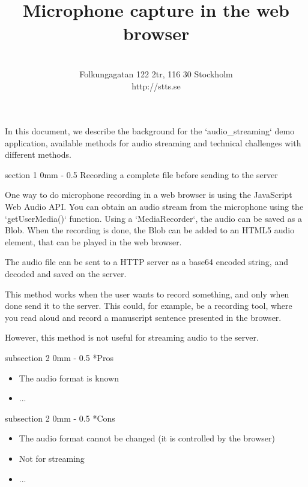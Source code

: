 \documentclass[11pt, a4paper, twoside]{article}
\title{ Microphone capture in the web browser }
\author{ \stts \\
  Folkungagatan 122 2tr, 116 30 Stockholm\\
  http://stts.se }
\makeatletter
\renewcommand{\subsection}{\@startsection
   {subsection}%
   {2}%
   {0mm}%
   {-\baselineskip}%
   {0.5\baselineskip}%
   {\bfseries\sffamily\large}}%
\renewcommand{\section}{\@startsection
   {section}%
   {1}%
   {0mm}%
   {-\baselineskip}%
   {0.5\baselineskip}%
   {\bfseries\sffamily\Large}}%
\makeatother
\begin{document}
  
  \maketitle
 \cfoot{\thepage (\pageref{LastPage})}  
  

In this document, we describe the background for the `audio\_streaming` demo application, available methods for audio streaming and technical challenges with different methods.


\section{Recording a complete file before sending to the server}

One way to do microphone recording in a web browser is using the JavaScript Web Audio API. You can obtain an audio stream from the microphone using the `getUserMedia()` function. Using a `MediaRecorder`, the audio can be saved as a Blob. When the recording is done, the Blob can be added to an HTML5 audio element, that can be played in the web browser.

The audio file can be sent to a HTTP server as a base64 encoded string, and decoded and saved on the server.

This method works when the user wants to record something, and only when done send it to the server. This could, for example, be a recording tool, where you read aloud and record a manuscript sentence presented in the browser.

However, this method is not useful for streaming audio to the server.

\subsection*{Pros}
\begin{itemize}
\item The audio format is known
\item ...
  \end{itemize}

\subsection*{Cons}
\begin{itemize}
\item The audio format cannot be changed (it is controlled by the browser)
\item Not for streaming
\item ...
\end{itemize}
\end{document}
